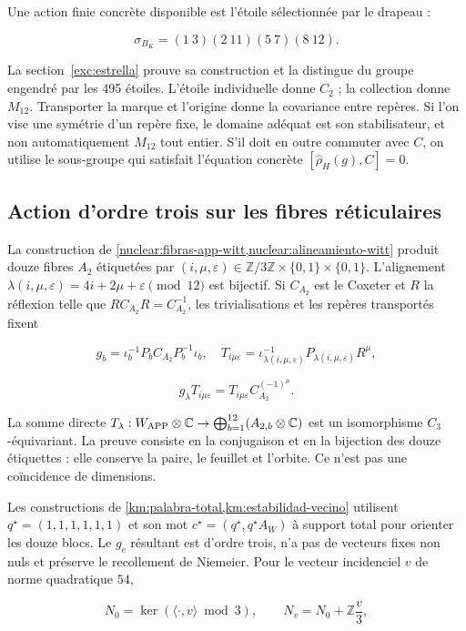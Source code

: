 Une action finie concrète disponible est l’étoile sélectionnée par le drapeau :

\[
\sigma_{B_K}=(1\ 3)(2\ 11)(5\ 7)(8\ 12).
\]

La section~\ref{exc:estrella} prouve sa construction et la distingue du groupe engendré par les 495 étoiles. L’étoile individuelle donne \(C_2\) ; la collection donne \(M_{12}\). Transporter la marque et l’origine donne la covariance entre repères. Si l’on vise une symétrie d’un repère fixe, le domaine adéquat est son stabilisateur, et non automatiquement \(M_{12}\) tout entier. S’il doit en outre commuter avec \(C\), on utilise le sous-groupe qui satisfait l’équation concrète \([\widehat\rho_H(g),C]=0\).

\subsection{Action d’ordre trois sur les fibres réticulaires
}\label{nuc04:c3}

La construction de \cref{nuclear:fibras-app-witt,nuclear:alineamiento-witt} produit douze fibres \(A_2\) étiquetées par \((i,\mu,\varepsilon)\in\mathbb Z/3\mathbb Z\times\{0,1\}\times\{0,1\}\). L’alignement \(\lambda(i,\mu,\varepsilon)=4i+2\mu+\varepsilon\pmod{12}\) est bijectif. Si \(C_{A_2}\) est le Coxeter et \(R\) la réflexion telle que \(RC_{A_2}R=C_{A_2}^{-1}\), les trivialisations et les repères transportés fixent


\[
g_b=\iota_b^{-1}P_bC_{A_2}P_b^{-1}\iota_b,
\quad T_{i\mu\varepsilon}=\iota_{\lambda(i,\mu,\varepsilon)}^{-1}P_{\lambda(i,\mu,\varepsilon)}R^\mu,
\]

\[
g_\lambda T_{i\mu\varepsilon}
=T_{i\mu\varepsilon}C_{A_2}^{(-1)^\mu}.
\]

La somme directe \(T_\lambda:W_{\rm APP}\otimes\mathbb C\to\bigoplus_{b=1}^{12}(A_{2,b}\otimes\mathbb C)\) est un isomorphisme \(C_3\)-équivariant. La preuve consiste en la conjugaison et en la bijection des douze étiquettes : elle conserve la paire, le feuillet et l’orbite. Ce n’est pas une coïncidence de dimensions.

Les constructions de \cref{km:palabra-total,km:estabilidad-vecino} utilisent \(q^\star=(1,1,1,1,1,1)\) et son mot \(c^\star=(q^\star,q^\star A_W)\) à support total pour orienter les douze blocs. Le \(g_c\) résultant est d’ordre trois, n’a pas de vecteurs fixes non nuls et préserve le recollement de Niemeier. Pour le vecteur incidenciel \(v\) de norme quadratique \(54\),

\[
N_0=\ker(\langle\cdot,v\rangle\bmod3),\qquad
N_v=N_0+\mathbb Z\frac v3,
\]


